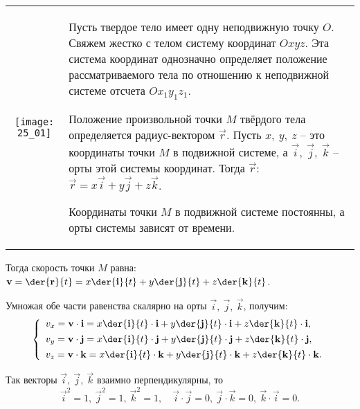 
\begin{table}[h!]
    \vspace*{-2em}
    \begin{tabular}{C{.4}m{.55\textwidth}}
        \texttt{[image: 25\_01]} &
        Пусть твердое тело имеет одну неподвижную точку \( O \). Свяжем жестко
        с телом систему координат \( Oxyz \). Эта система координат однозначно
        определяет положение рассматриваемого тела по отношению к неподвижной
        системе отсчета \( Ox_1y_1z_1 \).

        Положение произвольной точки \( M \) твёрдого тела определяется
        радиус-вектором \( \vec{r} \). Пусть \( x,\ y,\ z \) -- это координаты
        точки \( M \) в подвижной системе, а \( \vec{i},\ \vec{j},\ \vec{k} \)
        -- орты этой системы координат. Тогда \( \vec{r} \):
        \( \vec{r} = x\vec{i} + y\vec{j} + z\vec{k} \).

        Координаты точки \( M \) в подвижной системе постоянны, а орты системы
        зависят от времени.
    \end{tabular}
    \vspace*{-1.5em}
\end{table}

Тогда скорость точки \( M \) равна: \( \ds \vec{v} = \der{\vec{r}}{t} =
x\der{\vec{i}}{t} + y\der{\vec{j}}{t} + z\der{\vec{k}}{t} \).

Умножая обе части равенства скалярно на орты \( \vec{i},\ \vec{j},\ \vec{k} \),
получим:
\[
    \left\{ \begin{array}{l}
        \ds v_x = \vec{v}\cdot\vec{i} = x\der{\vec{i}}{t}\cdot\vec{i} +
        y\der{\vec{j}}{t}\cdot\vec{i} + z\der{\vec{k}}{t}\cdot\vec{i}, \\[.4em]
        \ds v_y = \vec{v}\cdot\vec{j} = x\der{\vec{i}}{t}\cdot\vec{j} +
        y\der{\vec{j}}{t}\cdot\vec{j} + z\der{\vec{k}}{t}\cdot\vec{j}, \\[.4em]
        \ds v_z = \vec{v}\cdot\vec{k} = x\der{\vec{i}}{t}\cdot\vec{k} +
        y\der{\vec{j}}{t}\cdot\vec{k} + z\der{\vec{k}}{t}\cdot\vec{k}.
    \end{array} \right.
\]

Так векторы \( \vec{i},\ \vec{j},\ \vec{k} \) взаимно перпендикулярны, то
\[
    \vec{i}^2 = 1,\ \vec{j}^2 = 1,\ \vec{k}^2 = 1, \quad
    \vec{i}\cdot\vec{j} = 0,\ \vec{j}\cdot\vec{k} = 0,\ \vec{k}\cdot\vec{i} = 0.
\]

